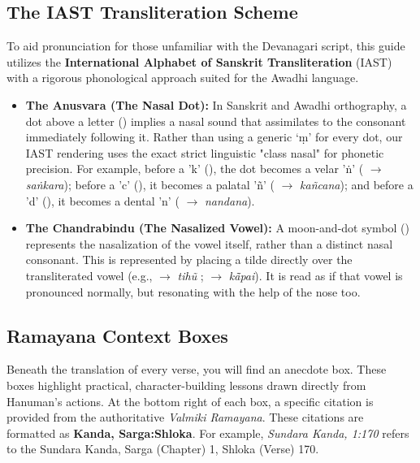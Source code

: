 \subsection*{The IAST Transliteration Scheme}
To aid pronunciation for those unfamiliar with the Devanagari script, this guide utilizes the \textbf{International Alphabet of Sanskrit Transliteration} (IAST) with a rigorous phonological approach suited for the Awadhi language.
\begin{itemize}
    \item \textbf{The Anusvara (The Nasal Dot):} In Sanskrit and Awadhi orthography, a dot above a letter () implies a nasal sound that assimilates to the consonant immediately following it. Rather than using a generic `ṃ' for every dot, our IAST rendering uses the exact strict linguistic "class nasal" for phonetic precision. For example, before a 'k' (), the dot becomes a velar 'ṅ' ( $\rightarrow$ \textit{saṅkara}); before a 'c' (), it becomes a palatal 'ñ' ( $\rightarrow$ \textit{kañcana}); and before a 'd' (), it becomes a dental 'n' ( $\rightarrow$ \textit{nandana}). 
    \item \textbf{The Chandrabindu (The Nasalized Vowel):} A moon-and-dot symbol () represents the nasalization of the vowel itself, rather than a distinct nasal consonant. 
    This is represented by placing a tilde directly over the transliterated vowel (e.g.,  $\rightarrow$ \textit{tihũ} ;  $\rightarrow$ \textit{kā̃pai}).  It is read as if that vowel is pronounced normally, but resonating with the help of the nose too. 
\end{itemize}

\newpage

\subsection*{Ramayana Context Boxes}
Beneath the translation of every verse, you will find an anecdote box. These boxes highlight practical, character-building lessons drawn directly from Hanuman's actions. At the bottom right of each box, a specific citation is provided from the authoritative \textit{Valmiki Ramayana}. These citations are formatted as \textbf{Kanda, Sarga:Shloka}. For example, \textit{Sundara Kanda, 1:170} refers to the Sundara Kanda, Sarga (Chapter) 1, Shloka (Verse) 170.

\vspace{1em}

